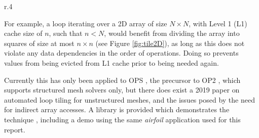 \begin{wrapfigure}{r}{.4\textwidth}
  \centering
  \caption{2D Loop Tiling}
  \label{fig:tile2D}
  \hspace{-1em}
\end{wrapfigure}
For example, a loop iterating over a 2D array of size $N \times N$, with Level 1 (L1) cache size of $n$, such that $n < N$, would benefit from dividing the array into squares of size at most $n \times n$ (see Figure \ref{fig:tile2D}), as long as this does not violate any data dependencies in the order of operations. Doing so prevents values from being evicted from L1 cache prior to being needed again.\par
Currently this has only been applied to OPS \cite{opstiling}, the precursor to OP2 \cite{opsmain}, which supports structured mesh solvers only, but there does exist a 2019 paper \cite{slope} on automated loop tiling for unstructured meshes, and the issues posed by the need for indirect array accesses. A library is provided which demonstrates the technique \cite{SLOPErep}, including a demo using the same \textit{airfoil} application used for this report.

